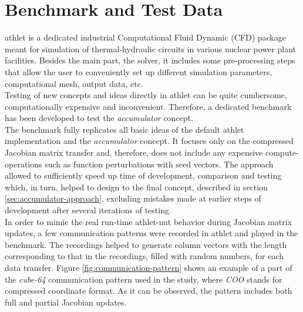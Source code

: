 \section{Benchmark and Test Data}
\label{sec:benchmark-and-test-data}


\acrshort{athlet} is a dedicated industrial Computational Fluid Dynamic (CFD) package meant for simulation of thermal-hydraulic circuits in various nuclear power plant facilities. Besides the main part, the solver, it includes some pre-processing steps that allow the user to conveniently set up different simulation parameters, computational mesh, output data, etc.\\


Testing of new concepts and ideas directly in \acrshort{athlet} can be quite cumbersome, computationally expensive and inconvenient. Therefore, a dedicated benchmark has been developed to test the \textit{accumulator} concept.\\


The benchmark fully replicates all basic ideas of the default \acrshort{athlet} implementation and the \textit{accumulator} concept. It  focuses only on the compressed Jacobian matrix transfer and, therefore, does not include any expensive compute-operations such as function perturbations with seed vectors. The approach allowed to sufficiently speed up time of development, comparison and testing which, in turn, helped to design to the final concept, described in section \ref{sec:accumulator-approach}, excluding mistakes made at earlier steps of development after several iterations of testing.\\


In order to mimic the real run-time \acrshort{athlet}-\acrshort{nut} behavior during Jacobian matrix updates, a few communication patterns were recorded in \acrshort{athlet} and played in the benchmark. The recordings helped to generate column vectors with the length corresponding to that in the recordings, filled with random numbers, for each data transfer. Figure \ref{fig:communication-pattern} shows an example of a part of the \textit{cube-64} communication pattern used in the study, where \textit{COO} stands for compressed coordinate format. As it can be observed, the pattern includes both full and partial Jacobian updates.\\


